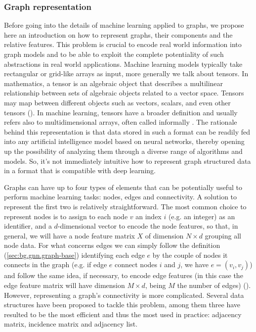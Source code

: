 \documentclass[binding=0.6cm]{sapthesis}
\newcommand{\mycite}[1]{(\cite{#1})}
\begin{document}
\subsubsection{Graph representation}
\label{sec:bg.gnn.graph-repr}
Before going into the details of machine learning applied to graphs, we propose here an introduction on how to represent graphs, their components and the relative features. This problem is crucial to encode real world information into graph models and to be able to exploit the complete potentiality of such abstractions in real world applications. Machine learning models typically take rectangular or grid-like arrays as input, more generally we talk about tensors. In mathematics, a tensor is an algebraic object that describes a multilinear relationship between sets of algebraic objects related to a vector space. Tensors may map between different objects such as vectors, scalars, and even other tensors \mycite{Vasilescu2009AM}. In machine learning, tensors have a broader definition and usually refers also to multidimensional arrays, often called informally . The rationale behind this representation is that data stored in such a format can be readily fed into any artificial intelligence model based on neural networks, thereby opening up the possibility of analyzing them through a diverse range of algorithms and models. So, it’s not immediately intuitive how to represent graph structured data in a format that is compatible with deep learning.

Graphs can have up to four types of elements that can be potentially useful to perform machine learning tasks: nodes, edges and connectivity. A solution to represent the first two is relatively straightforward. The most common choice to represent nodes is to assign to each node $v$ an index $i$ (e.g. an integer) as an identifier, and a $d$-dimensional vector to encode the node features, so that, in general, we will have a node feature matrix $X$ of dimension ${N \times d}$ grouping all node data. For what concerns edges we can simply follow the definition (\cref{sec:bg.gnn.graph-base}) identifying each edge $e$ by the couple of nodes it connects in the graph (e.g. if edge $e$ connect nodes $i$ and $j$, we have $e = (v_i,v_j)$) and follow the same idea, if necessary, to encode edge features (in this case the edge feature matrix will have dimension $M \times d$, being $M$ the number of edges) \mycite{cormen2022introduction}. However, representing a graph’s connectivity is more complicated. Several data structures have been proposed to tackle this problem, among them three have resulted to be the most efficient and thus the most used in practice: adjacency matrix, incidence matrix and adjacency list.
\end{document}
